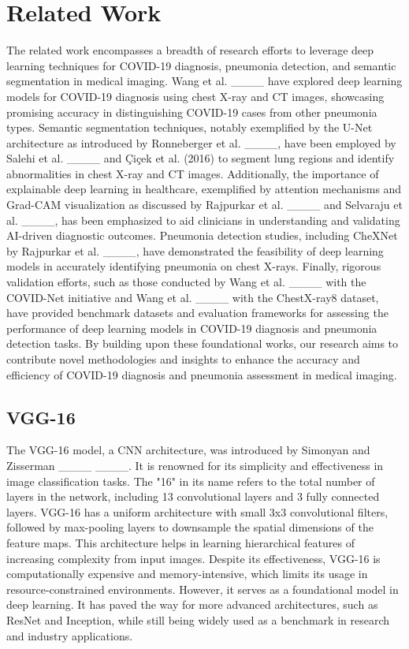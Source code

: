\section{Related Work}
The related work encompasses a breadth of research efforts to leverage deep learning techniques for COVID-19 diagnosis, pneumonia detection, and semantic segmentation in medical imaging. Wang et al. ____ have explored deep learning models for COVID-19 diagnosis using chest X-ray and CT images, showcasing promising accuracy in distinguishing COVID-19 cases from other pneumonia types. Semantic segmentation techniques, notably exemplified by the U-Net architecture as introduced by Ronneberger et al. ____, have been employed by Salehi et al. ____ and Çiçek et al. (2016) to segment lung regions and identify abnormalities in chest X-ray and CT images. Additionally, the importance of explainable deep learning in healthcare, exemplified by attention mechanisms and Grad-CAM visualization as discussed by Rajpurkar et al. ____ and Selvaraju et al. ____, has been emphasized to aid clinicians in understanding and validating AI-driven diagnostic outcomes. Pneumonia detection studies, including CheXNet by Rajpurkar et al. ____, have demonstrated the feasibility of deep learning models in accurately identifying pneumonia on chest X-rays. Finally, rigorous validation efforts, such as those conducted by Wang et al. ____ with the COVID-Net initiative and Wang et al. ____ with the ChestX-ray8 dataset, have provided benchmark datasets and evaluation frameworks for assessing the performance of deep learning models in COVID-19 diagnosis and pneumonia detection tasks. By building upon these foundational works, our research aims to contribute novel methodologies and insights to enhance the accuracy and efficiency of COVID-19 diagnosis and pneumonia assessment in medical imaging.

\subsection{VGG-16}
The VGG-16 model, a CNN architecture, was introduced by Simonyan and Zisserman ____ ____. It is renowned for its simplicity and effectiveness in image classification tasks. The "16" in its name refers to the total number of layers in the network, including 13 convolutional layers and 3 fully connected layers. VGG-16 has a uniform architecture with small 3x3 convolutional filters, followed by max-pooling layers to downsample the spatial dimensions of the feature maps. This architecture helps in learning hierarchical features of increasing complexity from input images. Despite its effectiveness, VGG-16 is computationally expensive and memory-intensive, which limits its usage in resource-constrained environments. However, it serves as a foundational model in deep learning. It has paved the way for more advanced architectures, such as ResNet and Inception, while still being widely used as a benchmark in research and industry applications.

